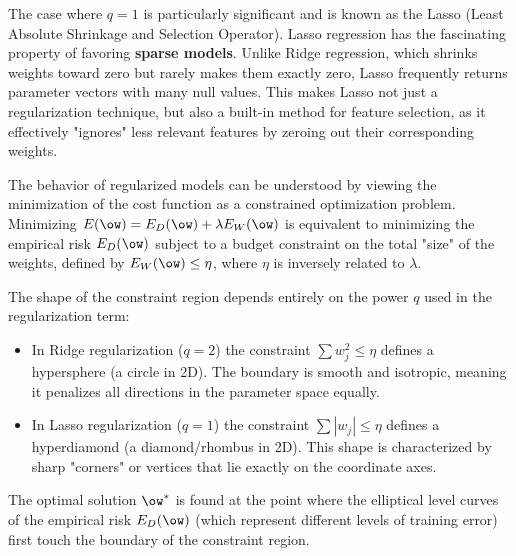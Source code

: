 The case where $q=1$ is particularly significant and is known as the \alert{Lasso} (Least Absolute Shrinkage and Selection Operator). Lasso regression has the fascinating property of favoring \textbf{sparse models}. Unlike Ridge regression, which shrinks weights toward zero but rarely makes them exactly zero, Lasso frequently returns parameter vectors with many null values. This makes Lasso not just a regularization technique, but also a built-in method for feature selection, as it effectively "ignores" less relevant features by zeroing out their corresponding weights.


The behavior of regularized models can be understood by viewing the minimization of the cost function as a \alert{constrained optimization} problem. Minimizing $E(\ow) = E_D(\ow) + \lambda E_W(\ow)$ is equivalent to minimizing the empirical risk $E_D(\ow)$ subject to a budget constraint on the total "size" of the weights, defined by $E_W(\ow) \leq \eta$, where $\eta$ is inversely related to $\lambda$.


The shape of the constraint region depends entirely on the power $q$ used in the regularization term:

\begin{itemize}
    \item In Ridge regularization ($q=2$) the constraint $\sum w_j^2 \leq \eta$ defines a \alert{hypersphere} (a circle in 2D). The boundary is smooth and isotropic, meaning it penalizes all directions in the parameter space equally.
    \item In Lasso regularization ($q=1$) the constraint $\sum |w_j| \leq \eta$ defines a \alert{hyperdiamond} (a diamond/rhombus in 2D). This shape is characterized by sharp "corners" or vertices that lie exactly on the coordinate axes.
\end{itemize}


The optimal solution $\ow^*$ is found at the point where the elliptical level curves of the empirical risk $E_D(\ow)$ (which represent different levels of training error) first touch the boundary of the constraint region.

